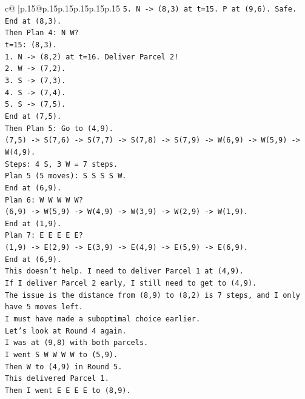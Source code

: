 \documentclass{article}
\begin{document}
{\begin{supertabular}{c@{$\;$}|p{.15\linewidth}@{}p{.15\linewidth}p{.15\linewidth}p{.15\linewidth}p{.15\linewidth}p{.15\linewidth}}
{{{\texttt{5. N {-}> (8,3) at t=15. P at (9,6). Safe.} \\
\texttt{End at (8,3).} \\
\texttt{Then Plan 4: N W?} \\
\texttt{t=15: (8,3).} \\
\texttt{1. N {-}> (8,2) at t=16. Deliver Parcel 2!} \\
\texttt{2. W {-}> (7,2).} \\
\texttt{3. S {-}> (7,3).} \\
\texttt{4. S {-}> (7,4).} \\
\texttt{5. S {-}> (7,5).} \\
\texttt{End at (7,5).} \\
\texttt{Then Plan 5: Go to (4,9).} \\
\texttt{(7,5) {-}> S(7,6) {-}> S(7,7) {-}> S(7,8) {-}> S(7,9) {-}> W(6,9) {-}> W(5,9) {-}> W(4,9).} \\
\texttt{Steps: 4 S, 3 W = 7 steps.} \\
\texttt{Plan 5 (5 moves): S S S S W.} \\
\texttt{End at (6,9).} \\
\texttt{Plan 6: W W W W W?} \\
\texttt{(6,9) {-}> W(5,9) {-}> W(4,9) {-}> W(3,9) {-}> W(2,9) {-}> W(1,9).} \\
\texttt{End at (1,9).} \\
\texttt{Plan 7: E E E E E?} \\
\texttt{(1,9) {-}> E(2,9) {-}> E(3,9) {-}> E(4,9) {-}> E(5,9) {-}> E(6,9).} \\
\texttt{End at (6,9).} \\
\texttt{This doesn't help. I need to deliver Parcel 1 at (4,9).} \\
\texttt{If I deliver Parcel 2 early, I still need to get to (4,9).} \\
\texttt{The issue is the distance from (8,9) to (8,2) is 7 steps, and I only have 5 moves left.} \\
\texttt{I must have made a suboptimal choice earlier.} \\
\texttt{Let's look at Round 4 again.} \\
\texttt{I was at (9,8) with both parcels.} \\
\texttt{I went S W W W W to (5,9).} \\
\texttt{Then W to (4,9) in Round 5.} \\
\texttt{This delivered Parcel 1.} \\
\texttt{Then I went E E E E to (8,9).} \\
}}}
\end{supertabular}}
\end{document}
